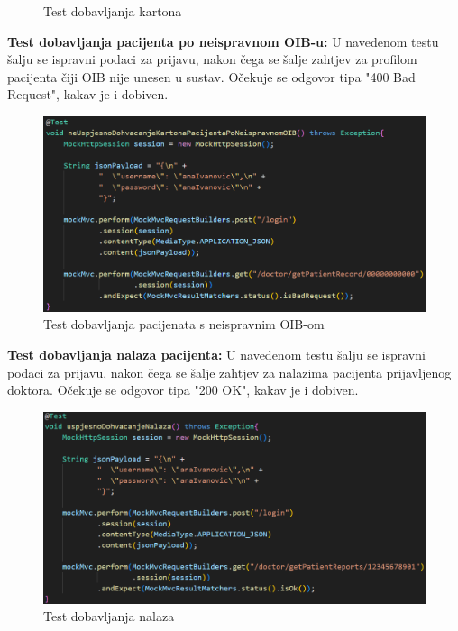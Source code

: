 \begin{packed_enum}
\begin{figure}[H]
					\centering
					\caption{Test dobavljanja kartona}
					\label{fig:isjecak4}
				\end{figure}
				\item \textbf{Test dobavljanja pacijenta po neispravnom OIB-u:}
				\text U navedenom testu šalju se ispravni podaci za prijavu, nakon čega se šalje zahtjev za profilom pacijenta čiji OIB nije unesen u sustav. Očekuje se odgovor tipa "400 Bad Request", kakav je i dobiven.
				\begin{figure}[H]
					\includegraphics[scale=0.6]{slike/isjecak5.PNG} %
					\centering
					\caption{Test dobavljanja pacijenata s neispravnim OIB-om}
					\label{fig:isjecak5}
				\end{figure}
				\item \textbf{Test dobavljanja nalaza pacijenta:}
				\text U navedenom testu šalju se ispravni podaci za prijavu, nakon čega se šalje zahtjev za nalazima pacijenta prijavljenog doktora. Očekuje se odgovor tipa "200 OK", kakav je i dobiven.
				\begin{figure}[H]
					\includegraphics[scale=0.6]{slike/isjecak6.PNG} %
					\centering
					\caption{Test dobavljanja nalaza}
					\label{fig:isjecak6}
				\end{figure}
				
			\end{packed_enum}
			\clearpage
			
